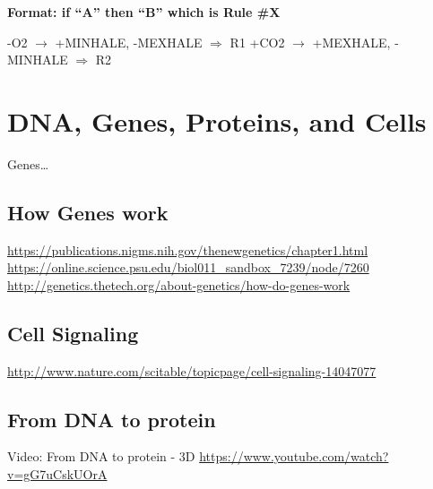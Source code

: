 \documentclass[11pt, a4paper, oneside]{article}   	%
\begin{document}
\textbf{Format: if ``A'' then ``B'' which is Rule \#X}
\begin{outline}
\point -O2 $\rightarrow$ +MINHALE, -MEXHALE $\Rightarrow$ R1
\point +CO2 $\rightarrow$ +MEXHALE, -MINHALE $\Rightarrow$ R2
\end{outline}


\section{DNA, Genes, Proteins, and Cells}

Genes\ldots

\subsection{How Genes work}
\url{https://publications.nigms.nih.gov/thenewgenetics/chapter1.html}
\url{https://online.science.psu.edu/biol011_sandbox_7239/node/7260}
\url{http://genetics.thetech.org/about-genetics/how-do-genes-work}

\subsection{Cell Signaling}
\url{http://www.nature.com/scitable/topicpage/cell-signaling-14047077}

\subsection{From DNA to protein}

Video: From DNA to protein - 3D
\url{https://www.youtube.com/watch?v=gG7uCskUOrA}
\end{document}
